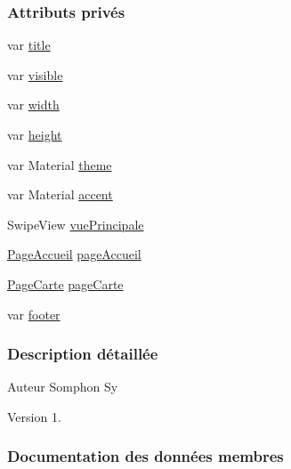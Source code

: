 \subsubsection*{Attributs privés}
\begin{DoxyCompactItemize}
\item 
var \hyperlink{class_application_a5502df5b638abdf96ab6a995f5a1b942}{title}
\item 
var \hyperlink{class_application_a11dc1b351cae7aca3815fe7c12a8fd30}{visible}
\item 
var \hyperlink{class_application_a4fffe27d37ef2eb5975e18405e1c500b}{width}
\item 
var \hyperlink{class_application_a4f2ad3cef3bc151a8bcccf868a9568ad}{height}
\item 
var Material \hyperlink{class_application_acb2df40484493fb118e57e9dba8aa9d7}{theme}
\item 
var Material \hyperlink{class_application_a97c99a04ac1a1364a3118596f90e95e3}{accent}
\item 
Swipe\+View \hyperlink{class_application_aa725ab76431c16db88823ae84d69268d}{vue\+Principale}
\item 
\hyperlink{class_page_accueil}{Page\+Accueil} \hyperlink{class_application_a226e1b6b8d71ee2716386de3b99dc847}{page\+Accueil}
\item 
\hyperlink{class_page_carte}{Page\+Carte} \hyperlink{class_application_a6e982ff7788a5196389702b5cdc45e41}{page\+Carte}
\item 
var \hyperlink{class_application_ab1ae6209562017c3a95b47108cb5af6b}{footer}
\end{DoxyCompactItemize}


\subsubsection{Description détaillée}
\begin{DoxyAuthor}{Auteur}
Somphon Sy
\end{DoxyAuthor}
\begin{DoxyVersion}{Version}
1. 
\end{DoxyVersion}


\subsubsection{Documentation des données membres}
\mbox{\label{class_application_a97c99a04ac1a1364a3118596f90e95e3}} 
